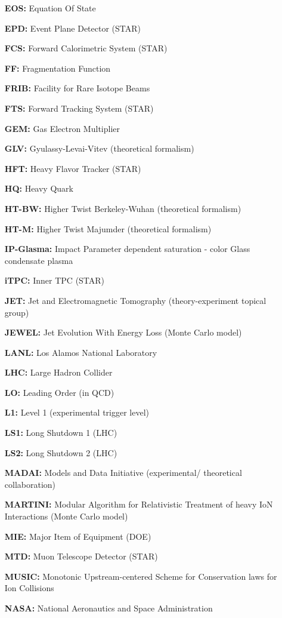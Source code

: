 \begin{itemize}
\item[\bf EOS:] Equation Of State
\item[\bf EPD:] Event Plane Detector (STAR)
\item[\bf FCS:] Forward Calorimetric System (STAR)
\item[\bf FF:] Fragmentation Function
\item[\bf FRIB:] Facility for Rare Isotope Beams
\item[\bf FTS:] Forward Tracking System (STAR)
\item[\bf GEM:] Gas Electron Multiplier
\item[\bf GLV:] Gyulassy-Levai-Vitev (theoretical formalism)
\item[\bf HFT:] Heavy Flavor Tracker (STAR)
\item[\bf HQ:] Heavy Quark
\item[\bf HT-BW:] Higher Twist Berkeley-Wuhan (theoretical formalism)
\item[\bf HT-M:] Higher Twist Majumder (theoretical formalism)
\item[\bf IP-Glasma:] Impact Parameter dependent saturation - color Glass condensate plasma
\item[\bf iTPC:] Inner TPC (STAR)
\item[\bf JET:] Jet and Electromagnetic Tomography (theory-experiment topical group)
\item[\bf JEWEL:] Jet Evolution With Energy Loss (Monte Carlo model)
\item[\bf LANL:] Los Alamos National Laboratory
\item[\bf LHC:] Large Hadron Collider
\item[\bf LO:] Leading Order (in QCD)
\item[\bf L1:] Level 1 (experimental trigger level)
\item[\bf LS1:] Long Shutdown 1 (LHC)
\item[\bf LS2:] Long Shutdown 2 (LHC)
\item[\bf MADAI:] Models and Data Initiative (experimental/ theoretical collaboration)
\item[\bf MARTINI:] Modular Algorithm for Relativistic Treatment of heavy IoN Interactions (Monte Carlo model)
\item[\bf MIE:] Major Item of Equipment (DOE)
\item[\bf MTD:] Muon Telescope Detector (STAR)
\item[\bf MUSIC:] Monotonic Upstream-centered Scheme for Conservation laws for Ion Collisions
\item[\bf NASA:] National Aeronautics and Space Administration

\end{itemize}
